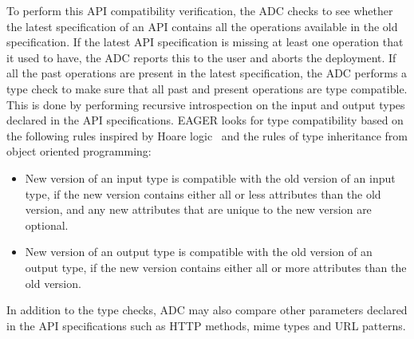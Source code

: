 To perform this API compatibility verification, the ADC checks to see whether
the latest specification of an API contains all the operations available in
the old specification. If the latest API specification is missing at least one
operation that it used to have, the ADC reports this to the user and aborts
the deployment. If all the past operations are present in the latest
specification, the ADC performs a type check to make sure that all past and
present operations are type compatible. This is done by performing recursive
introspection on the input and output types declared in the API
specifications. EAGER looks for type compatibility based on the following
rules inspired by Hoare logic~\cite{Hoare:1969:ABC:363235.363259} and the
rules of type inheritance from object oriented programming:
\begin{itemize}
\item New version of an input type is compatible with the old version of an input type, if the new version contains either all or less attributes than the 
old version, and any new attributes that are unique to the new version are optional.
\item New version of an output type is compatible with the old version of an output type, if the new version contains either all or more attributes than the 
old version.
\end{itemize}
In addition to the type checks, ADC may also compare other parameters declared in the API specifications
such as HTTP methods, mime types and URL patterns.


